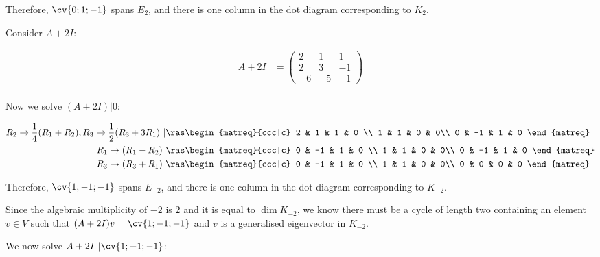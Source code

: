 \documentclass[11pt]{scrartcl}
\begin{document}
\begin{soln}
Therefore, $\cv{0;1;-1}$ spans $E_2$, and there is one column in the dot diagram
corresponding to $K_2$.

Consider $A+2I$:

\begin{align}
A+2I  & =
 \begin{pmatrix}
   2 & 1   & 1  \\
   2  & 3 & -1 \\
   -6 & -5  & -1
 \end{pmatrix}\\
\end{align}

Now we solve $(A+2I)| 0$:

\begin{align}
R_2\to \frac{1}{4}(R_1+R_2), R_3\to \frac{1}{2}(R_{3}+3R_1)\ |      &\ras
        \begin{matreq}{ccc|c}
   2 & 1   & 1 & 0 \\
   1  & 1 & 0  & 0\\
   0 & -1  & 1 & 0
        \end{matreq}\\
R_1\to (R_1-R_2) \ &\ras
        \begin{matreq}{ccc|c}
   0 & -1   & 1 & 0 \\
   1  & 1 & 0  & 0\\
   0 & -1  & 1 & 0
        \end{matreq}\\
R_3\to (R_3+R_1) \ &\ras
        \begin{matreq}{ccc|c}
   0 & -1   & 1 & 0 \\
   1  & 1 & 0  & 0\\
   0 & 0  & 0 & 0
        \end{matreq}
\end{align}

Therefore, $\cv{1;-1;-1}$ spans $E_{-2}$, and there is one column in the dot diagram
corresponding to $K_{-2}$. 

Since the algebraic multiplicity of $-2$ is $2$ and it is equal to
$\dim K_{-2}$, we know there must be a cycle of length two containing
an element $v\in V$ such that $(A+2I)v= \cv{1;-1;-1}$ and $v$ is a
generalised eigenvector in $K_{-2}$.

We now solve $A+2I\ | \cv{1;-1;-1}$:


\end{soln}
\end{document}
